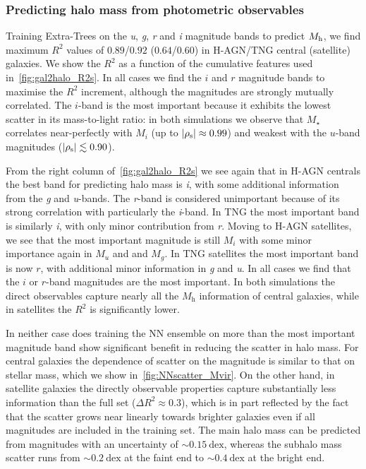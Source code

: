 \documentclass[useAMS,usenatbib]{mnras}
\begin{document}
\subsubsection{Predicting halo mass from photometric observables}

Training Extra-Trees on the \textit{u}, \textit{g}, \textit{r} and \textit{i} magnitude bands to predict $M_{\rm h}$, we find maximum $R^2$ values of $0.89$/$0.92$ ($0.64$/$0.60$) in H-AGN/TNG central (satellite) galaxies. We show the $R^2$ as a function of the cumulative features used in~\cref{fig:gal2halo_R2s}. In all cases we find the $i$ and $r$ magnitude bands to maximise the $R^2$ increment, although the magnitudes are strongly mutually correlated. The $i$-band is the most important because it exhibits the lowest scatter in its mass-to-light ratio: in both simulations we observe that $M_\star$ correlates near-perfectly with $M_i$ (up to $\left|\rho_{\rm s}\right| \approx 0.99$) and weakest with the $u$-band magnitudes ($\left|\rho_{\rm s}\right| \lesssim 0.90$).

From the right column of~\cref{fig:gal2halo_R2s} we see again that in H-AGN centrals the best band for predicting halo mass is \textit{i}, with some additional information from the \textit{g} and \textit{u}-bands. The \textit{r}-band is considered unimportant because of its strong correlation with particularly the \textit{i}-band. In TNG the most important band is similarly \textit{i}, with only minor contribution from \textit{r}. Moving to H-AGN satellites, we see that the most important magnitude is still $M_i$ with some minor importance again in $M_u$ and  and $M_g$. In TNG satellites the most important band is now $r$, with additional minor information in \textit{g} and \textit{u}. In all cases we find that the $i$ or $r$-band magnitudes are the most important. In both simulations the direct observables capture nearly all the $M_\text{h}$ information of central galaxies, while in satellites the $R^2$ is significantly lower.

In neither case does training the \ac{NN} ensemble on more than the most important magnitude band show significant benefit in reducing the scatter in halo mass. For central galaxies the dependence of scatter on the magnitude is similar to that on stellar mass, which we show in~\cref{fig:NNscatter_Mvir}. On the other hand, in satellite galaxies the directly observable properties capture substantially less information than the full set ($\Delta R^2 \approx 0.3$), which is in part reflected by the fact that the scatter grows near linearly towards brighter galaxies even if all magnitudes are included in the training set. The main halo mass can be predicted from magnitudes with an uncertainty of $\sim0.15~\mathrm{dex}$, whereas the subhalo mass scatter runs from $\sim0.2~\mathrm{dex}$ at the faint end to $\sim0.4~\mathrm{dex}$ at the bright end.
\end{document}
